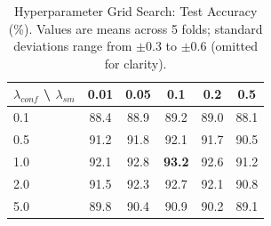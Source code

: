\begin{table}[t]
\centering
\caption{Hyperparameter Grid Search: Test Accuracy (\%). Values are means across 5 folds; standard deviations range from $\pm$0.3 to $\pm$0.6 (omitted for clarity).}
\label{tab:hyperparameter}
\begin{tabularx}{\textwidth}{X|ccccc}
\hline
$\lambda_{conf}$ \textbackslash{} $\lambda_{sm}$ & 0.01 & 0.05 & 0.1 & 0.2 & 0.5 \\
\hline
0.1 & 88.4 & 88.9 & 89.2 & 89.0 & 88.1 \\
0.5 & 91.2 & 91.8 & 92.1 & 91.7 & 90.5 \\
1.0 & 92.1 & 92.8 & \textbf{93.2} & 92.6 & 91.2 \\
2.0 & 91.5 & 92.3 & 92.7 & 92.1 & 90.8 \\
5.0 & 89.8 & 90.4 & 90.9 & 90.2 & 89.1 \\
\hline
\end{tabularx}
\end{table}